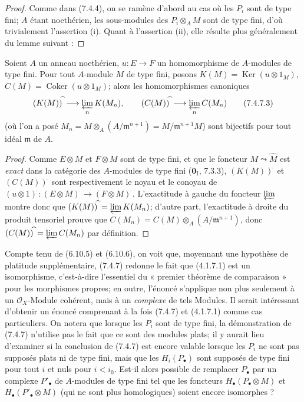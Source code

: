 \begin{proof}
Comme dans (7.4.4), on se ramène d'abord au cas où les $P_i$ sont de type fini;
$A$ étant noethérien, les sous-modules des $P_i\otimes_A M$ sont de type fini,
d'où trivialement l'assertion (i). Quant à l'assertion (ii), elle résulte plus
généralement du lemme suivant :
\end{proof}

\begin{lemma}[7.4.7.2]
Soient $A$ un anneau noethérien, $u:E\to F$ un homomorphisme de $A$-modules de
type fini. Pour tout $A$-module $M$ de type fini, posons
$K(M)=\operatorname{Ker}(u\otimes1_M)$,
$C(M)=\operatorname{Coker}(u\otimes1_M)$;
alors les homomorphismes canoniques
\[
  (K(M))^{\widehat{\,}}\longrightarrow\varprojlim_n K(M_n),
  \qquad
  (C(M))^{\widehat{\,}}\longrightarrow\varprojlim_n C(M_n)
  \tag{7.4.7.3}\label{III.7.4.7.3.fr}
\]
(où l'on a posé
$M_n=M\otimes_A(A/\mathfrak m^{n+1})=M/\mathfrak m^{n+1}M$) sont bijectifs
pour tout idéal $\mathfrak m$ de $A$.
\end{lemma}

\begin{proof}
Comme $E\otimes M$ et $F\otimes M$ sont de type fini, et que le foncteur
$M\leadsto\widehat M$ est \emph{exact} dans la catégorie des $A$-modules de type fini
($\mathbf{0}_{\mathrm I}$, 7.3.3), $(K(M))^{\widehat{\,}}$ et $(C(M))^{\widehat{\,}}$ sont
respectivement le noyau et le conoyau de
$(u\otimes1)^{\widehat{\,}}:(E\otimes M)^{\widehat{\,}}\longrightarrow(F\otimes M)^{\widehat{\,}}$.
L'exactitude à gauche du foncteur $\varprojlim$ montre donc que
$(K(M))^{\widehat{\,}}=\varprojlim K(M_n)$; d'autre part, l'exactitude à droite du
produit tensoriel prouve que
$C(M_n)=C(M)\otimes_A(A/\mathfrak m^{n+1})$, donc
$(C(M))^{\widehat{\,}}=\varprojlim C(M_n)$ par définition.
\end{proof}

\begin{remark}[7.4.8]
Compte tenu de (6.10.5) et (6.10.6), on voit que, moyennant une hypothèse de
platitude supplémentaire, (7.4.7) redonne le fait que (4.1.7.1) est un
isomorphisme, c'est-à-dire l'essentiel du « premier théorème de comparaison »
pour les morphismes propres; en outre, l'énoncé s'applique non plus seulement
à un $\mathscr O_X$-Module cohérent, mais à un \emph{complexe} de tels Modules. Il
serait intéressant d'obtenir un énoncé comprenant à la fois (7.4.7) et
(4.1.7.1) comme cas particuliers. On notera que lorsque les $P_i$ sont de type
fini, la démonstration de (7.4.7) n'utilise pas le fait que ce sont des modules
plats; il y aurait lieu d'examiner si la conclusion de (7.4.7) est encore
valable lorsque les $P_i$ ne sont pas supposés plats ni de type fini, mais que
les $H_i(P_\bullet)$ sont supposés de type fini pour tout $i$ et nuls pour
$i<i_0$. Est-il alors possible de remplacer $P_\bullet$ par un complexe
$P'_\bullet$ de $A$-modules de type fini tel que les foncteurs
$H_\bullet(P_\bullet\otimes M)$ et $H_\bullet(P'_\bullet\otimes M)$ (qui ne
sont plus homologiques) soient encore isomorphes ?
\end{remark}

